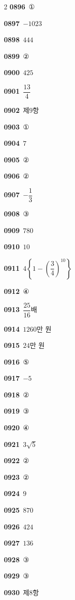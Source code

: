 \documentclass[10pt,a4paper]{article}
\begin{document}
\begin{multicols}{2}
\noindent\textbf{0896}\ ①\par
\noindent\textbf{0897}\ $-1023$\par
\noindent\textbf{0898}\ $444$\par
\noindent\textbf{0899}\ ②\par
\noindent\textbf{0900}\ $425$\par
\noindent\textbf{0901}\ $\dfrac{13}{4}$\par
\noindent\textbf{0902}\ 제$9$항\par
\noindent\textbf{0903}\ ①\par
\noindent\textbf{0904}\ $7$\par
\noindent\textbf{0905}\ ②\par
\noindent\textbf{0906}\ ②\par
\noindent\textbf{0907}\ $-\dfrac{1}{3}$\par
\noindent\textbf{0908}\ ③\par
\noindent\textbf{0909}\ $780$\par
\noindent\textbf{0910}\ $10$\par
\noindent\textbf{0911}\ $4\left\{1-\left(\dfrac{3}{4}\right)^{10}\right\}$\par
\noindent\textbf{0912}\ ④\par
\noindent\textbf{0913}\ $\dfrac{25}{16}$배\par
\noindent\textbf{0914}\ $1260$만 원\par
\noindent\textbf{0915}\ $24$만 원\par
\noindent\textbf{0916}\ ⑤\par
\noindent\textbf{0917}\ $-5$\par
\noindent\textbf{0918}\ ②\par
\noindent\textbf{0919}\ ③\par
\noindent\textbf{0920}\ ④\par
\noindent\textbf{0921}\ $3\sqrt{5}$\par
\noindent\textbf{0922}\ ②\par
\noindent\textbf{0923}\ ②\par
\noindent\textbf{0924}\ $9$\par
\noindent\textbf{0925}\ $870$\par
\noindent\textbf{0926}\ $424$\par
\noindent\textbf{0927}\ $136$\par
\noindent\textbf{0928}\ ③\par
\noindent\textbf{0929}\ ③\par
\noindent\textbf{0930}\ 제$8$항\par

\end{multicols}
\end{document}
